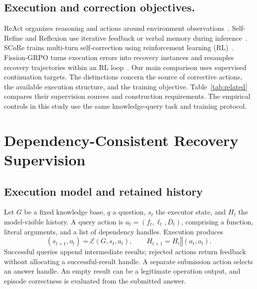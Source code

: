 \subsection{Execution and correction objectives.}
ReAct organizes reasoning and actions around environment observations~\cite{yao2023react}. Self-Refine and Reflexion use iterative feedback or verbal memory during inference~\cite{madaan2023selfrefine,shinn2023reflexion}. SCoRe trains multi-turn self-correction using reinforcement learning (RL)~\cite{kumar2025score}. Fission-GRPO turns execution errors into recovery instances and resamples recovery trajectories within an RL loop~\cite{zhang2026fission}. Our main comparison uses supervised continuation targets. The distinctions concern the source of corrective actions, the available execution structure, and the training objective. Table~\ref{tab:related} compares their supervision sources and construction requirements. The empirical controls in this study use the same knowledge-query task and training protocol.

\begin{table}[htbp]
 \centering
 \caption{Recovery-supervision sources and construction requirements.}
 \label{tab:related}
 \RecoveryRelatedTableEN
\end{table}

\section{Dependency-Consistent Recovery Supervision}

\subsection{Execution model and retained history}

Let $G$ be a fixed knowledge base, $q$ a question, $s_t$ the executor state, and $H_t$ the model-visible history. A query action is $a_t=(f_t,\ell_t,D_t)$, comprising a function, literal arguments, and a list of dependency handles. Execution produces
\begin{equation}
 (s_{t+1},o_t)=\mathcal{E}(G,s_t,a_t),\qquad
 H_{t+1}=H_t\mathbin{\Vert}(a_t,o_t).
\end{equation}
Successful queries append intermediate results; rejected actions return feedback without allocating a successful-result handle. A separate submission action selects an answer handle. An empty result can be a legitimate operation output, and episode correctness is evaluated from the submitted answer.

